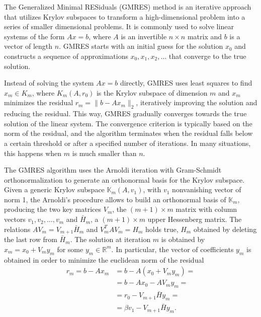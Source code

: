 The Generalized Minimal RESiduals (GMRES) method is an iterative approach that utilizes Krylov subspaces to transform a high-dimensional problem into a series of smaller dimensional problems.  It is commonly used to solve linear systems of the form $Ax = b$, where $A$ is an invertible $n \times n$ matrix and $b$ is a vector of length $n$.
GMRES starts with an initial guess for the solution $x_0$ and constructs a sequence of approximations $x_0, x_1, x_2, \ldots$ that converge to the true solution.


Instead of solving the system $Ax = b$ directly, GMRES uses least squares to find $x_m \in K_m$, where $K_m(A, r_0)$ is the Krylov subspace of dimension $m$ and $x_m$ minimizes the residual $r_m = \|b - Ax_m\|_2$, iteratively improving the solution and reducing the residual. This way, GMRES gradually converges towards the true solution of the linear system. The convergence criterion is typically based on the norm of the residual, and the algorithm terminates when the residual falls below a certain threshold or after a specified number of iterations. In many situations, this happens when $m$ is much smaller than $n$.

The GMRES algorithm uses the Arnoldi iteration with Gram-Schmidt orthonormalization to generate an orthonormal basis for the Krylov subspace.
Given a generic Krylov subspace $\mathbb{K}_m(A, v_1)$, with $v_1$ nonvanishing vector of norm 1, the Arnoldi's procedure allows to build an orthonormal basis of $\mathbb{K}_m$, producing the two key matrices $V_m$, the $(m+1) \times m$ matrix with column vectors $v_1, v_2, \ldots, v_m$ and $\bar{H}_m$, a $(m+1) \times m$ upper Hessenberg matrix. The relations $AV_m = V_{m+1} \bar{H}_m $ and $V_m^TAV_m = H_m$ holds true, $H_m$ obtained by deleting the last row from $\bar{H}_m$. 
The solution at iteration $m$ is obtained by $x_m = x_0 + V_my_m$ for some $y_m \in \mathbb{R}^m$. In particular, the vector of coefficients $y_m$ is obtained in order to minimize the euclidean norm of the residual 
\begin{align*}
r_m = b - Ax_m &= b - A (x_0 + V_m y_m) = \\
&= b - Ax_0 - AV_my_m =\\
&= r_0 - V_{m+1}\bar{H} y_m =\\
&= \beta v_1 - V_{m+1}\bar{H} y_m.
\end{align*}

